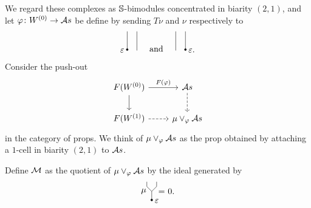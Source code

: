 We regard these complexes as $\S$-bimodules concentrated in biarity $(2,1)$, and let $\varphi \colon W^{(0)} \to \A$ be define by sending $T \nu$ and $\nu$ respectively to
\begin{equation*}
	\begin{tikzpicture}[scale=.2]
	\draw (-4,0)--(-4,4);
	\draw (-6,0)--(-6,4);
	\draw [fill] (-6,.2) circle [radius=.2];
	\node [left] at (-6,0) {$\varepsilon$};
	
	\node at (0,.4) {and};
	
	\draw (4,0)--(4,4);
	\draw (6,0)--(6,4);
	\draw [fill] (6,.2) circle [radius=.2];
	\node [right] at (6,0) {$\varepsilon$.};
	\end{tikzpicture}
\end{equation*}
Consider the push-out
\begin{equation*}
\begin{tikzcd}
F(W^{(0)}) \arrow[r, "F(\varphi)"] \arrow[d] & \A \arrow[d, dashed] \\
F(W^{(1)}) \arrow[r, dashed] & \mu \vee_\varphi \A
\end{tikzcd}
\end{equation*}
in the category of props. We think of $\mu \vee_\varphi \A$ as the prop obtained by attaching a $1$-cell in biarity $(2,1)$ to $\A$.

Define $\M$ as the quotient of $\mu \vee_\varphi \A$ by the ideal generated by
\begin{equation*}
\begin{tikzpicture}[scale=.2]
\draw (5,4)--(5,3)--(6,2)--(6,0);
\draw (7,4)--(7,3)--(6,2);
\node [left] at (5.5,2) {$\mu$};
\draw [fill] (6,.2) circle [radius=.2];
\node [right] at (6,0) {$\varepsilon$};

\node at (9,2) {= 0.};
\end{tikzpicture}
\end{equation*}

